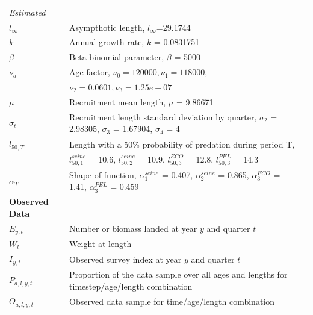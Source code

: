 \documentclass[review]{elsarticle}
\begin{document}
\begin{table}[h]
\begin{tabular}{|l|l l|}
\textit{Estimated} \\

$l_\infty$  &   Asympthotic length, $l_\infty$=29.1744  \\

\it $k$       &   Annual growth rate, $k$ = 0.0831751    \\

$\beta$ & Beta-binomial parameter, $\beta$ = 5000 \\

$\nu_{a}$ & Age factor, $\nu_{0} = 120000, \nu_{1} = 118000,$\\
& $\nu_{2} = 0.0601, \nu_{3} = 1.25e-07$ \\

$\mu$ & Recruitment mean length, $\mu$ = 9.86671 \\

$\sigma_t$ & Recruitment length standard deviation by quarter, $\sigma_2$ = 2.98305,  $\sigma_3$ = 1.67904, $\sigma_4$ = 4 \\

$l_{50,T}$ & Length with a 50\% probability of predation during period T,\\
& $l_{50,1}^{seine}$ = 10.6, $l_{50,2}^{seine}$ = 10.9, $l_{50,3}^{ECO}$ = 12.8,  $l_{50,3}^{PEL}$ = 14.3 \\

$\alpha_{T}$ & Shape of function, $\alpha_{1}^{seine}$ = 0.407, $\alpha_{2}^{seine}$ = 0.865, $\alpha_{3}^{ECO}$ = 1.41,    $\alpha_{3}^{PEL}$ = 0.459\\

\textbf{Observed Data}        \\

\it $E_{y,t}$   & Number or biomass landed at year $y$ and quarter $t$ \\


$W_{l}$   &     Weight at length \\

$I_{y,t}$  &  Observed survey index at year $y$ and quarter $t$ \\

$P_{a,l,y,t}$  &    Proportion of the data sample over all ages and lengths for timestep/age/length combination      \\

$O_{a,l,y,t}$ & Observed data sample for time/age/length combination \\


\end{tabular}
\end{table}
\end{document}
